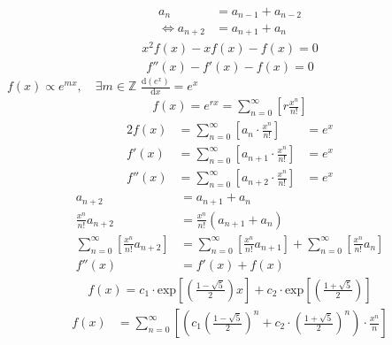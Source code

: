 \documentclass{article}
\begin{document}
\begin{align}
    a_{n}&= a_{n - 1} + a_{n - 2} \nonumber \\
\iff a_{n+  2} &= a_{n+  1} +  a_n \label{eq:fib-def}
\end{align}
\begin{align*}
x^2 f\left( x \right) -  x f \left( x \right) -  f\left( x \right)=  0
\end{align*}
\begin{align*}
f''\left( x \right)- f'\left( x \right)- f\left( x \right)=  0
\end{align*}
$f\left( x \right) \propto e^{mx}, \quad \exists m \in \mathbb{Z}$
$\frac{\mathrm{d}\left( e^x \right) }{\mathrm{d} x} = e^x$
\begin{align*}
f\left( x \right)= e^{rx} = \sum^{\infty}_{n= 0}   \left[ r \frac{x^n}{n!} \right]
\end{align*}
\begin{alignat}{2}
    f \left( x \right) &=  \sum^{\infty}_{n= 0}   \left[ a_{n} \cdot  \frac{x^n}{n!} \right]   &= e^x \label{eq:exp-gen-def-1} \\
    f'\left( x \right) &=  \sum^{\infty}_{n= 0}   \left[ a_{n+1} \cdot  \frac{x^n}{n!} \right]  &= e^x  \label{eq:exp-gen-def-2} \\
    f''\left( x \right) &=  \sum^{\infty}_{n= 0}   \left[ a_{n+2} \cdot  \frac{x^n}{n!} \right] &= e^x  \label{eq:exp-gen-def-3}
\end{alignat}
\begin{align*}
a_{n+  2}    &= a_{n+  1} +  a_{n}\\
\frac{x^n}{n!}   a_{n+  2}    &= \frac{x^n}{n!}\left( a_{n+  1} +  a_{n}  \right)\\
\sum^{\infty}_{n= 0} \left[ \frac{x^n}{n!}   a_{n+  2} \right]        &= \sum^{\infty}_{n= 0}   \left[ \frac{x^n}{n!} a_{n+  1} \right]  + \sum^{\infty}_{n= 0}   \left[ \frac{x^n}{n!} a_{n}  \right]  \\
f''\left( x \right) &= f'\left( x \right)+  f\left( x \right)
\end{align*}
\begin{align*}
f\left( x \right)= c_1 \cdot  \mathrm{exp}\left[ \left( \frac{1- \sqrt{5} }{2} \right)x \right] +  c_2 \cdot  \mathrm{exp}\left[ \left( \frac{1 +  \sqrt{5} }{2} \right) \right]
\end{align*}
\begin{align*}
f\left( x \right)&= \sum^{\infty}_{n= 0}   \left[ \left( c_1\left( \frac{1- \sqrt{5} }{2} \right)^n +  c_2 \cdot  \left( \frac{1+ \sqrt{5} }{2} \right)^n \right) \cdot  \frac{x^n}{n} \right]
\end{align*}
\end{document}
